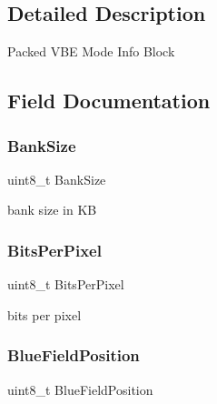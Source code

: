 \subsection{Detailed Description}
Packed V\+BE Mode Info Block 

\subsection{Field Documentation}
\hypertarget{struct____attribute_____a7e31ea09e6e6755e3a504b9c76b3f545}{}\label{struct____attribute_____a7e31ea09e6e6755e3a504b9c76b3f545} 
\subsubsection{\texorpdfstring{Bank\+Size}{BankSize}}
{\footnotesize\ttfamily uint8\+\_\+t Bank\+Size}



bank size in KB 

\hypertarget{struct____attribute_____a03756ae144fce823087a2a4255bf4bb1}{}\label{struct____attribute_____a03756ae144fce823087a2a4255bf4bb1} 
\subsubsection{\texorpdfstring{Bits\+Per\+Pixel}{BitsPerPixel}}
{\footnotesize\ttfamily uint8\+\_\+t Bits\+Per\+Pixel}



bits per pixel 

\hypertarget{struct____attribute_____a4d0396c07a4f07556332fec2b4a6c2bf}{}\label{struct____attribute_____a4d0396c07a4f07556332fec2b4a6c2bf} 
\subsubsection{\texorpdfstring{Blue\+Field\+Position}{BlueFieldPosition}}
{\footnotesize\ttfamily uint8\+\_\+t Blue\+Field\+Position}

